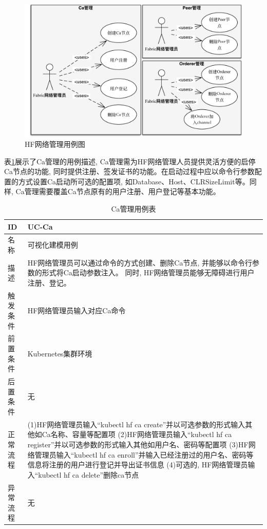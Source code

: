 \begin{figure}[!htbp] %
    \centering %
    \includegraphics[width=1.0\textwidth]{FIGs/chapter5/fabric_use_case.pdf} %
    \caption{HF网络管理用例图} %
    \label{fabric_use_case} %
\end{figure}%

表\ref{ca_use_case}展示了Ca管理的用例描述, Ca管理需为HF网络管理人员提供灵活方便的启停Ca节点的功能, 同时提供注册、签发证书的功能。在启动过程中应以命令行参数配置的方式设置Ca启动所可选的配置项, 如Database、Host、CLRSizeLimit等。同样, Ca管理需要覆盖Ca节点原有的用户注册、用户登记等基本功能。

{\footnotesize
\begin{longtable}[h]{m{60pt}|m{280pt}}
    \caption[Ca管理用例表]{Ca管理用例表} \label{ca_use_case} \\
        \hline  
        ID&UC-Ca\\
        \hline
        名称&可视化建模用例\\
        \hline
        描述&HF网络管理员可以通过命令的方式创建、删除Ca节点, 并能够以命令行参数的形式将Ca启动参数注入。 同时, HF网络管理员能够无障碍进行用户注册、登记。\\
        \hline
        触发条件&HF网络管理员输入对应Ca命令\\
        \hline
        前置条件&Kubernetes集群环境\\
        \hline
        后置条件&无\\
        \hline
        正常流程& (1)HF网络管理员输入“kubectl hf ca create”并以可选参数的形式输入其他如Ca名称、容量等配置项
        \newline (2)HF网络管理员输入“kubectl hf ca register”并以可选参数的形式输入其他如用户名、密码等配置项
        \newline (3)HF网络管理员输入“kubectl hf ca enroll”并输入已经注册过的用户名、密码等信息将注册的用户进行登记并导出证书信息
        \newline (4)可选的, HF网络管理员输入“kubectl hf ca delete”删除ca节点 \\
        \hline
        异常流程&无\\
        \hline
    \end{longtable} 
}

